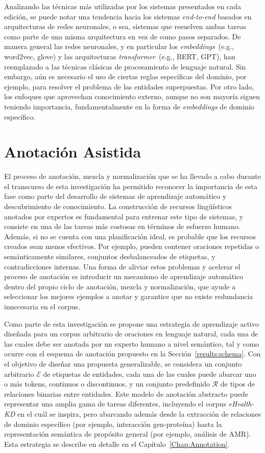 Analizando las técnicas más utilizadas por los sistemas presentados en cada edición, se puede notar una tendencia hacia los sistemas \textit{end-to-end} basados en arquitecturas de redes neuronales, o sea, sistemas que resuelven ambas tareas como parte de una misma arquitectura en vez de como pasos separados.
De manera general las redes neuronales, y en particular los \textit{embeddings}~(e.g., word2vec, glove) y las arquitecturas \textit{transformer}~(e.g., BERT, GPT), han reemplazado a las técnicas clásicas de procesamiento de lenguaje natural. Sin embargo, aún es necesario el uso de ciertas reglas específicas del dominio, por ejemplo, para resolver el problema de las entidades superpuestas. Por otro lado, los enfoques que aprovechan conocimiento externo, aunque no son mayoría siguen teniendo importancia, fundamentalmente en la forma de \textit{embeddings} de dominio específico.

\section{Anotación Asistida}\label{results:assisted-ann}

El proceso de anotación, mezcla y normalización que se ha llevado a cabo durante el transcurso de esta investigación ha permitido reconocer la importancia de esta fase como parte del desarrollo de sistemas de aprendizaje automático y descubrimiento de conocimiento.
La construcción de recursos lingüísticos anotados por expertos es fundamental para entrenar este tipo de sistemas, y consiste en una de las tareas más costosas en términos de esfuerzo humano.
Además, si no se cuenta con una planificación ideal, es probable que los recursos creados sean menos efectivos. Por ejemplo, pueden contener oraciones repetidas o semánticamente similares, conjuntos desbalanceados de etiquetas, y contradicciones internas.
Una forma de aliviar estos problemas y acelerar el proceso de anotación es introducir un mecanismo de aprendizaje automático dentro del propio ciclo de anotación, mezcla y normalización, que ayude a seleccionar los mejores ejemplos a anotar y garantice que no existe redundancia innecesaria en el corpus.

Como parte de esta investigación se propone una estrategia de aprendizaje activo diseñada para un corpus arbitrario de oraciones en lenguaje natural, cada una de las cuales debe ser anotada por un experto humano a nivel semántico, tal y como ocurre con el esquema de anotación propuesto en la Sección~\ref{results:schema}.
Con el objetivo de diseñar una propuesta generalizable, se considera un conjunto arbitrario $\mathcal{E}$ de etiquetas de entidades, cada una de las cuales puede abarcar uno o más tokens, continuos o discontinuos,
y un conjunto predefinido $\mathcal{R}$ de tipos de relaciones binarias entre entidades.
Este modelo de anotación abstracto puede representar una amplia gama de tareas diferentes, incluyendo el corpus \textit{eHealth-KD} en el cuál se inspira, pero abarcando además desde la extracción de relaciones de  dominio específico (por ejemplo, interacción gen-proteína) hasta la representación semántica de propósito general (por ejemplo, análisis de AMR).
Esta estrategia se describe en detalle en el Capítulo~\ref{Chap:Annotation}.

